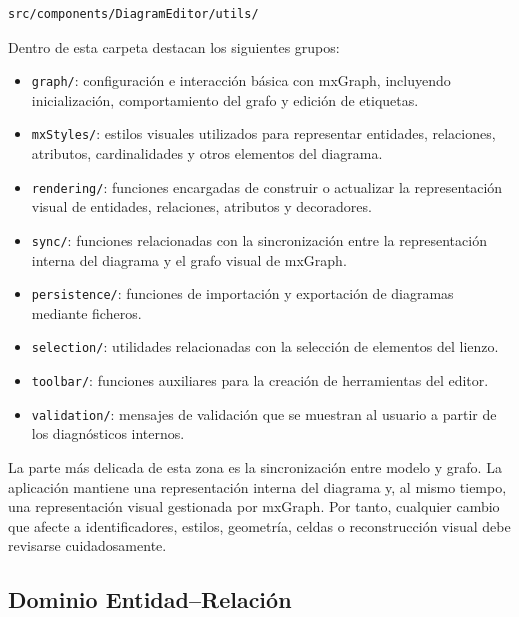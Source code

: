 \begin{verbatim}
src/components/DiagramEditor/utils/
\end{verbatim}

Dentro de esta carpeta destacan los siguientes grupos:

\begin{itemize}
\item \texttt{graph/}: configuración e interacción básica con mxGraph, incluyendo inicialización, comportamiento del grafo y edición de etiquetas.

\item \texttt{mxStyles/}: estilos visuales utilizados para representar entidades, relaciones, atributos, cardinalidades y otros elementos del diagrama.

\item \texttt{rendering/}: funciones encargadas de construir o actualizar la representación visual de entidades, relaciones, atributos y decoradores.

\item \texttt{sync/}: funciones relacionadas con la sincronización entre la representación interna del diagrama y el grafo visual de mxGraph.

\item \texttt{persistence/}: funciones de importación y exportación de diagramas mediante ficheros.

\item \texttt{selection/}: utilidades relacionadas con la selección de elementos del lienzo.

\item \texttt{toolbar/}: funciones auxiliares para la creación de herramientas del editor.

\item \texttt{validation/}: mensajes de validación que se muestran al usuario a partir de los diagnósticos internos.

\end{itemize}

La parte más delicada de esta zona es la sincronización entre modelo y grafo. La aplicación mantiene una representación interna del diagrama y, al mismo tiempo, una representación visual gestionada por mxGraph. Por tanto, cualquier cambio que afecte a identificadores, estilos, geometría, celdas o reconstrucción visual debe revisarse cuidadosamente.

\subsection{Dominio Entidad--Relación}

